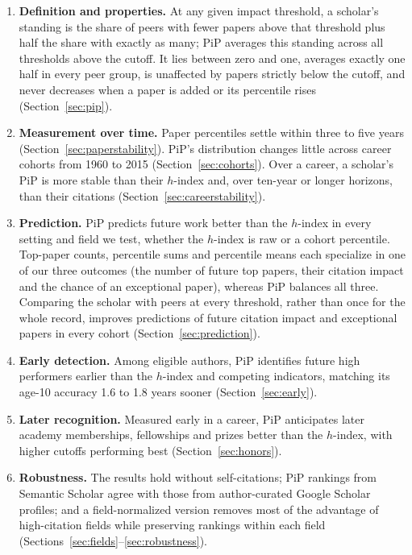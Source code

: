 \documentclass[11pt]{article}
\begin{document}
\begin{enumerate}
  \item \textbf{Definition and properties.} At any given impact threshold, a scholar's standing is the share of peers
  with fewer papers above that threshold plus half the share with exactly as many; PiP averages this standing across
  all thresholds above the cutoff. It lies between zero and one, averages exactly one half in every peer group, is
  unaffected by papers strictly below the cutoff, and never decreases when a paper is added or its percentile rises
  (Section~\ref{sec:pip}).
  \item \textbf{Measurement over time.} Paper percentiles settle within three to five years
  (Section~\ref{sec:paperstability}). PiP's distribution changes little across career cohorts from 1960 to 2015
  (Section~\ref{sec:cohorts}). Over a career, a scholar's PiP is more stable than their $h$-index and, over ten-year or
  longer horizons, than their citations (Section~\ref{sec:careerstability}).
  \item \textbf{Prediction.} PiP predicts future work better than the $h$-index in every setting and field we test,
  whether the $h$-index is raw or a cohort percentile. Top-paper counts, percentile sums and percentile means each
  specialize in one of our three outcomes (the number of future top papers, their citation impact and the chance of an
  exceptional paper), whereas PiP balances all three. Comparing the scholar with peers at every threshold, rather than
  once for the whole record, improves predictions of future citation impact and exceptional papers in every cohort
  (Section~\ref{sec:prediction}).
  \item \textbf{Early detection.} Among eligible authors, PiP identifies future high performers earlier than the
  $h$-index and competing indicators, matching its age-10 accuracy 1.6 to 1.8 years sooner (Section~\ref{sec:early}).
  \item \textbf{Later recognition.} Measured early in a career, PiP anticipates later academy memberships, fellowships
  and prizes better than the $h$-index, with higher cutoffs performing best (Section~\ref{sec:honors}).
  \item \textbf{Robustness.} The results hold without self-citations; PiP rankings from Semantic Scholar agree with
  those from author-curated Google Scholar profiles; and a field-normalized version removes most of the advantage of
  high-citation fields while preserving rankings within each field (Sections~\ref{sec:fields}--\ref{sec:robustness}).
\end{enumerate}
\end{document}
